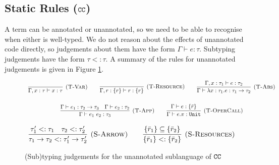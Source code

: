 \subsection{Static Rules ($\mathtt{CC}$)}

A term can be annotated or unannotated, so we need to be able to
recognise when either is well-typed. We do not reason about the
effects of unannotated code directly, so judgements about them have
the form $\Gamma \vdash e: \tau$. Subtyping judgements have the form
$\tau <: \tau$. A summary of the rules for unannotated judgements is
given in Figure \ref{fig:unannotated_static_rules}.

\begin{figure}
\vspace{-5pt}


\[
\begin{array}{c}


\infer[\textsc{(T-Var)}]
	{\Gamma, x: \tau \vdash x: \tau}
	{}
\hspace{5ex}
\infer[\textsc{(T-Resource)}]
	{\Gamma, r: \{ r \} \vdash r : \{ r \}}
	{}

\hspace{5ex}
\infer[\textsc{(T-Abs)}]
	{\Gamma \vdash \lambda x: \tau_1.e : \tau_1 \rightarrow \tau_2}
	{\Gamma, x: \tau_1 \vdash e: \tau_2}\\[4ex]
	
\infer[\textsc{(T-App)}]
	{\Gamma \vdash e_1~e_2: \tau_3}
	{\Gamma \vdash e_1: \tau_2 \rightarrow \tau_3 & \Gamma \vdash e_2: \tau_2}
\hspace{5ex}
\infer[\textsc{(T-OperCall)}]
	{\Gamma \vdash e.\pi: \kwa{Unit}}
	{\Gamma \vdash e: \{ \bar r \}}

\end{array}
\]

\fbox{$\tau <: \tau$}

\[
\begin{array}{c}

\infer[\textsc{(S-Arrow)}]
	{ \tau_1 \rightarrow \tau_2 <: \tau_1' \rightarrow \tau_2' }
	{ \tau_1' <: \tau_1 & \tau_2 <: \tau_2' }
\hspace{5ex}
\infer[\textsc{(S-Resources)}]
	{ \{ \bar r_1 \} <: \{ \bar r_2 \} }
	{ \{ \bar r_1 \} \subseteq \{ \bar r_2 \} }

\end{array}
\]

\vspace{-7pt}
\caption{(Sub)typing judgements for the unannotated sublanguage of $\mathtt{CC}$}
\label{fig:unannotated_static_rules}
\end{figure}


